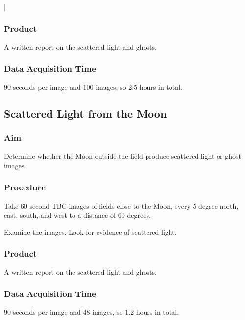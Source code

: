 |\documentclass{article}
\begin{document}
\subsubsection{Product}

A written report on the scattered light and ghosts.

\subsubsection{Data Acquisition Time}

90 seconds per image and 100 images, so 2.5 hours in total.


\subsection{Scattered Light from the Moon}

\subsubsection{Aim}

Determine whether the Moon outside the field produce scattered light or ghost images.

\subsubsection{Procedure}

Take 60 second TBC images of fields close to the Moon, every 5 degree north, east, south, and west to a distance of 60 degrees.

Examine the images. Look for evidence of scattered light.

\subsubsection{Product}

A written report on the scattered light and ghosts.

\subsubsection{Data Acquisition Time}

90 seconds per image and 48 images, so 1.2 hours in total.

\end{document}
